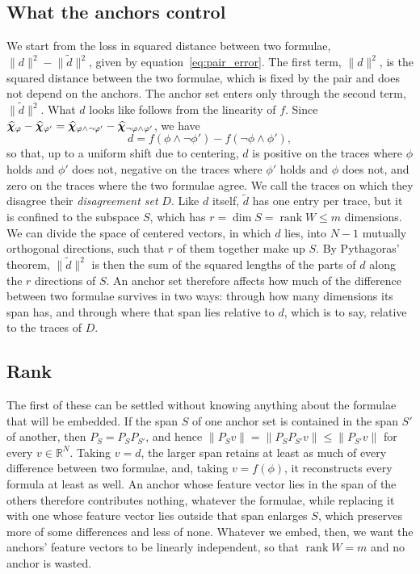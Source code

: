 \documentclass[titlepage,a4paper,11pt]{report}
\begin{document}
    \subsection{What the anchors control}\label{sec:what_anchors_control}
    We start from the loss in squared distance between two formulae, $\lVert d\rVert^2-\lVert\tilde d\rVert^2$, given by equation~\eqref{eq:pair_error}. The first term, $\lVert d\rVert^2$, is the squared distance between the two formulae, which is fixed by the pair and does not depend on the anchors. The anchor set enters only through the second term, $\lVert \tilde d\rVert^2$. What $d$ looks like follows from the linearity of $f$. Since $\bm{\widehat\chi}_\varphi-\bm{\widehat\chi}_{\varphi'}=\bm{\widehat\chi}_{\varphi\land\neg\varphi'}-\bm{\widehat\chi}_{\neg\varphi\land\varphi'}$, we have
    \begin{equation}\label{eq:difference_vector}
        d=f(\phi\land\neg\phi')-f(\neg\phi\land\phi'),
    \end{equation}
    so that, up to a uniform shift due to centering, $d$ is positive on the traces where $\phi$ holds and $\phi'$ does not, negative on the traces where $\phi'$ holds and $\phi$ does not, and zero on the traces where the two formulae agree. We call the traces on which they disagree their \emph{disagreement set} $D$. Like $d$ itself, $\tilde d$ has one entry per trace, but it is confined to the subspace $S$, which has $r=\dim S=\operatorname{rank}W\le m$ dimensions. We can divide the space of centered vectors, in which $d$ lies, into $N-1$ mutually orthogonal directions, such that $r$ of them together make up $S$. By Pythagoras' theorem, $\lVert \tilde d\rVert^2$ is then the sum of the squared lengths of the parts of $d$ along the $r$ directions of $S$. An anchor set therefore affects how much of the difference between two formulae survives in two ways: through how many dimensions its span has, and through where that span lies relative to $d$, which is to say, relative to the traces of $D$.
 
    \subsection{Rank}\label{sec:rank}
    The first of these can be settled without knowing anything about the formulae that will be embedded. If the span $S$ of one anchor set is contained in the span $S'$ of another, then $P_S = P_S P_{S'}$, and hence $\lVert P_S v\rVert = \lVert P_S P_{S'} v\rVert \le \lVert P_{S'} v\rVert$ for every $v\in\mathbb R^N$. Taking $v=d$, the larger span retains at least as much of every difference between two formulae, and, taking $v=f(\phi)$, it reconstructs every formula at least as well. An anchor whose feature vector lies in the span of the others therefore contributes nothing, whatever the formulae, while replacing it with one whose feature vector lies outside that span enlarges $S$, which preserves more of some differences and less of none. Whatever we embed, then, we want the anchors' feature vectors to be linearly independent, so that $\operatorname{rank}W = m$ and no anchor is wasted.
 
\end{document}
